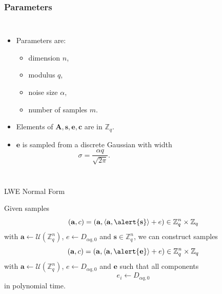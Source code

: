 \documentclass[10pt,compress]{beamer}
\renewcommand{\vec}[1]{\mathbf{#1}\xspace}
\renewcommand{\vec}[1]{\mathbf{#1}\xspace}
\newcommand{\Z}{\ensuremath{\mathbb{Z}}\xspace}
\begin{document}
\begin{frame}
  \frametitle{Parameters}

  \begin{columns}
    \begin{itemize}
    \item Parameters are: 
      \begin{itemize}
      \item dimension $n$, 
      \item modulus $q$,
      \item noise size $\alpha$,
       \item number of samples $m$.
      \end{itemize}

    \item Elements of $\vec{A}, \vec{s}, \vec{e}, \vec{c}$ are in $\mathbb{Z}_q$.
    \item $\vec{e}$ is sampled from a discrete Gaussian with width \[\sigma=\frac{\alpha q}{\sqrt{2 \pi}}.\]
    \end{itemize}
  \end{columns}
\end{frame}


\begin{frame}{LWE Normal Form}
  \begin{alertblock}{}
    Given samples \[(\vec{a},c)=(\vec{a},\langle\vec{a},\alert{\vec{s}}\rangle+ e) \in \Z_q^n \times \Z_q\] with $\vec{a} \gets \mathcal{U}(\Z_q^n)$, $e \gets D_{\alpha q,0}$ and $\vec{s} \in \Z_q^n$, we can construct samples \[(\vec{a}, c)=(\vec{a},\langle\vec{a},\alert{\vec{e}}\rangle+ e) \in \Z_q^n \times \Z_q\] 
    with $\vec{a} \gets \mathcal{U}(\Z_q^n)$, $e \gets D_{\alpha q, 0}$ and \alert{$\vec{e}$} such that all components \alert{$$e_i \gets D_{\alpha q, 0}$$} in polynomial time.
  \end{alertblock}
\end{frame}
\end{document}
